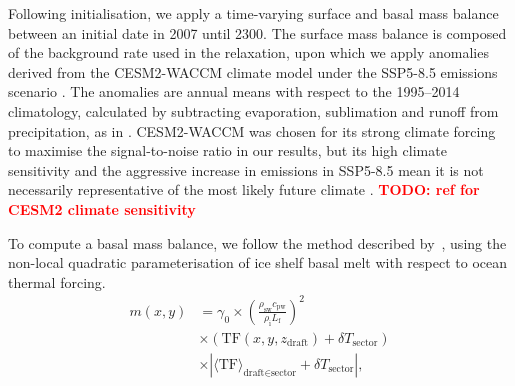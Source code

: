 \documentclass[journal abbreviation, manuscript]{copernicus}
\newcommand\todo[1]{\textbf{\textcolor{red}{TODO: #1}}}   %
\begin{document}

Following initialisation, we apply a time-varying surface and basal mass balance between an initial date in 2007 until 2300. The surface mass balance is composed of the background rate used in the relaxation, upon which we apply anomalies derived from the CESM2-WACCM climate model \citep{danabasogluCommunityEarthSystem2020} under the SSP5-8.5 emissions scenario \citep{meinshausenSharedSocioeconomicPathway2020}. The anomalies are annual means with respect to the 1995--2014 climatology, calculated by subtracting evaporation, sublimation and runoff from precipitation, as in \citep{nowickiExperimentalProtocolSea2020}. CESM2-WACCM was chosen for its strong climate forcing to maximise the signal-to-noise ratio in our results, but its high climate sensitivity and the aggressive increase in emissions in SSP5-8.5 mean it is not necessarily representative of the most likely future climate \citep{hausfatherAssessmentCurrentPolicy2025}. \todo{ref for CESM2 climate sensitivity}

To compute a basal mass balance, we follow the method described by~\cite{jourdainProtocolCalculatingBasal2020b}, using the non-local quadratic parameterisation of ice shelf basal melt with respect to ocean thermal forcing.
\begin{align}
    m(x, y) &= \gamma_0 \times {\left( \frac{\rho_{\text{sw}}c_{\text{pw}}}{\rho_\text{i} L_\text{f}} \right)}^2 \\ 
    &\times {\left( \text{TF}(x, y, z_{\text{draft}}) + \delta T_{\text{sector}} \right)} \\ 
    &\times |{\langle \text{TF} \rangle_{\text{draft} \in \text{sector}}} + \delta T_{\text{sector}}|,
\end{align}
\end{document}
